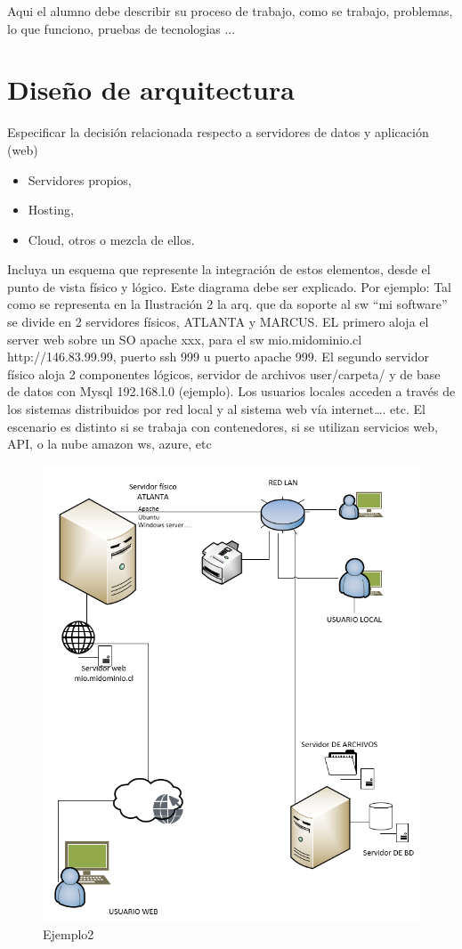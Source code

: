 
Aqui el alumno debe describir su proceso de trabajo, como se trabajo, problemas, lo que funciono, pruebas de tecnologias ...

\section{Diseño de arquitectura}

Especificar la decisión relacionada respecto a servidores de datos y aplicación (web)
\begin{itemize}
    \item Servidores propios,
    \item Hosting, 
    \item Cloud, otros o mezcla de ellos.
\end{itemize}
Incluya un esquema que represente la integración de estos elementos, desde el punto de vista físico y lógico. Este diagrama debe ser explicado. Por ejemplo: 
Tal como se representa en la Ilustración 2 la arq. que da soporte al  sw “mi software” se divide en 2 servidores físicos, ATLANTA y MARCUS. 
EL primero aloja el server web sobre un SO apache xxx, para el sw mio.midominio.cl http://146.83.99.99, puerto ssh 999 u puerto apache 999. El segundo  servidor físico aloja 2 componentes lógicos, servidor de archivos user/carpeta/ y de base de datos con Mysql 192.168.l.0 (ejemplo). Los usuarios locales acceden a través de los sistemas distribuidos por red local y al sistema web vía internet…. etc.
El escenario es distinto si se trabaja con contenedores, si se utilizan servicios web, API, o la nube amazon ws, azure, etc

\begin{figure}[H]
    \centering
    \includegraphics[scale=0.5]{figures/i6.png}
    \caption{Ejemplo2}
    \label{fig:e6}
\end{figure}


